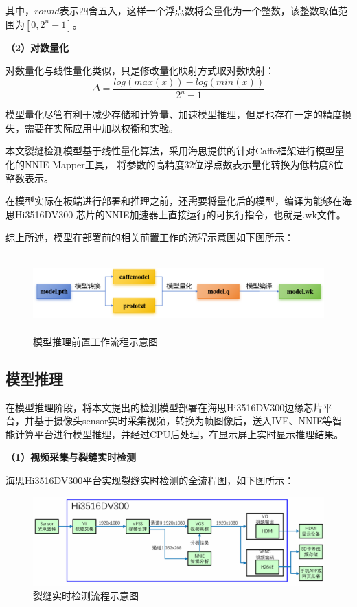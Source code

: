 其中，$round$表示四舍五入，这样一个浮点数将会量化为一个整数，该整数取值范围为$[0,2^n-1]$。

\textbf{（2）对数量化}

对数量化与线性量化类似，只是修改量化映射方式取对数映射：
\begin{equation}
    \Delta = \frac{log(max(x))-log(min(x))}{2^n - 1}
\end{equation}

模型量化尽管有利于减少存储和计算量、加速模型推理，但是也存在一定的精度损失，需要在实际应用中加以权衡和实验。

本文裂缝检测模型基于线性量化算法，采用海思提供的针对Caffe框架进行模型量化的NNIE Mapper工具，
将参数的高精度32位浮点数表示量化转换为低精度8位整数表示。

在模型实际在板端进行部署和推理之前，还需要将量化后的模型，编译为能够在海思Hi3516DV300
芯片的NNIE加速器上直接运行的可执行指令，也就是.wk文件。

综上所述，模型在部署前的相关前置工作的流程示意图如下图所示：
\begin{figure}[H]
    \includegraphics[width=14cm, height=3cm]{pic/pre-deploy.png}
    \caption{模型推理前置工作流程示意图}
    \label{pre-deploy}
\end{figure}

\subsection{模型推理}
在模型推理阶段，将本文提出的检测模型部署在海思Hi3516DV300边缘芯片平台，并基于摄像头sensor实时采集视频，转换为帧图像后，送入IVE、NNIE等智能计算平台进行模型推理，并经过CPU后处理，在显示屏上实时显示推理结果。

\textbf{（1）视频采集与裂缝实时检测}

海思Hi3516DV300平台实现裂缝实时检测的全流程图，如下图所示：

\begin{figure}[H]
    \includegraphics[width=14cm]{pic/detect-flow.png}
    \caption{裂缝实时检测流程示意图}
    \label{detect-flow}
\end{figure}

